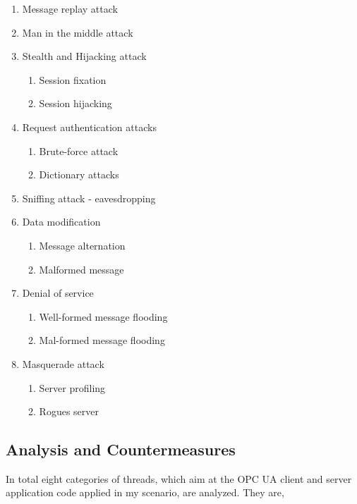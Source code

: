 \begin{enumerate}
	\item Message replay attack
	\item Man in the middle attack
	\item Stealth and Hijacking attack
  	\begin{enumerate}
    	\item Session fixation
	\item Session hijacking
	\end{enumerate}
		
    	\item Request authentication attacks
	\begin{enumerate}
		\item Brute-force attack
		\item Dictionary attacks
		\end{enumerate}
    	\item  Sniffing attack - eavesdropping

	\item Data modification
		\begin{enumerate}
		\item Message alternation
		\item Malformed message
		\end{enumerate}
	
	\item Denial of service
		\begin{enumerate}
		\item Well-formed message flooding
		\item Mal-formed message flooding
		\end{enumerate}

	\item Masquerade attack
		\begin{enumerate}
		\item Server profiling
		\item Rogues server
		\end{enumerate}
\end{enumerate}
\subsection{Analysis and Countermeasures}
In total eight categories of threads, which aim at the OPC UA client and server application code applied in my scenario, are analyzed. They are,

